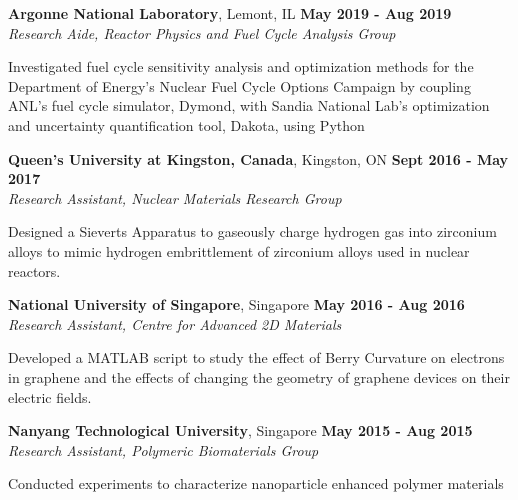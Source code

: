 \documentclass[margin,line]{resume}
\begin{document}
\begin{resume}
    \textbf{Argonne National Laboratory}, Lemont, IL \hfill \textbf{May 2019 - Aug 2019}\\\vspace{-4mm}%
		\textsl{Research Aide, Reactor Physics and Fuel Cycle Analysis Group}\\
                \begin{list2}
                        \item Investigated fuel cycle sensitivity analysis and optimization methods for the Department of Energy's 
                        Nuclear Fuel Cycle Options Campaign by coupling ANL's fuel cycle simulator, Dymond, 
                        with Sandia National Lab's optimization and uncertainty quantification tool, Dakota, using Python
                \end{list2}\vspace{-1.5mm}

        \textbf{Queen’s University at Kingston, Canada}, Kingston, ON \hfill \textbf{Sept 2016 - May 2017}\\\vspace{-4mm}%
		\textsl{Research Assistant, Nuclear Materials Research Group}\\
                \begin{list2}
                        \item Designed a Sieverts Apparatus to gaseously charge hydrogen gas into zirconium alloys to 
                        mimic hydrogen embrittlement of zirconium alloys used in nuclear reactors.
                \end{list2}\vspace{-1.5mm}

        \textbf{National University of Singapore}, Singapore \hfill \textbf{May 2016 - Aug 2016}\\\vspace{-4mm}%
		\textsl{Research Assistant, Centre for Advanced 2D Materials}\\
                \begin{list2}
                        \item Developed a MATLAB script to study the effect of Berry Curvature on electrons in graphene and the 
                        effects of changing the geometry of graphene devices on their electric fields. 
                \end{list2}\vspace{-1.5mm}

        \textbf{Nanyang Technological University}, Singapore \hfill \textbf{May 2015 - Aug 2015}\\\vspace{-4mm}%
		\textsl{Research Assistant, Polymeric Biomaterials Group}\\
                \begin{list2}
                        \item Conducted experiments to characterize nanoparticle enhanced polymer materials  
                \end{list2}\vspace{-1.5mm}


\end{resume}
\end{document}
